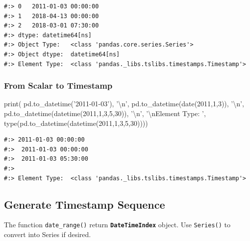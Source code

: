 \documentclass[
]{book}
\newenvironment{Shaded}{\begin{snugshade}}{\end{snugshade}}
\newcommand{\BuiltInTok}[1]{#1}
\newcommand{\CharTok}[1]{\textcolor[rgb]{0.5,0.5,0.5}{#1}}
\newcommand{\DecValTok}[1]{\textcolor[rgb]{0.06,0.06,0.06}{#1}}
\newcommand{\NormalTok}[1]{#1}
\newcommand{\StringTok}[1]{\textcolor[rgb]{0.5,0.5,0.5}{#1}}
\begin{document}
\begin{verbatim}
#:> 0   2011-01-03 00:00:00
#:> 1   2018-04-13 00:00:00
#:> 2   2018-03-01 07:30:00
#:> dtype: datetime64[ns] 
#:> Object Type:   <class 'pandas.core.series.Series'> 
#:> Object dtype:  datetime64[ns] 
#:> Element Type:  <class 'pandas._libs.tslibs.timestamps.Timestamp'>
\end{verbatim}

\hypertarget{from-scalar-to-timestamp}{%
\subsubsection{From Scalar to Timestamp}\label{from-scalar-to-timestamp}}

\begin{Shaded}
\begin{Highlighting}[]
\BuiltInTok{print}\NormalTok{( pd.to_datetime(}\StringTok{'2011-01-03'}\NormalTok{), }\StringTok{'}\CharTok{\textbackslash{}n}\StringTok{'}\NormalTok{,}
\NormalTok{       pd.to_datetime(date(}\DecValTok{2011}\NormalTok{,}\DecValTok{1}\NormalTok{,}\DecValTok{3}\NormalTok{)), }\StringTok{'}\CharTok{\textbackslash{}n}\StringTok{'}\NormalTok{,}
\NormalTok{       pd.to_datetime(datetime(}\DecValTok{2011}\NormalTok{,}\DecValTok{1}\NormalTok{,}\DecValTok{3}\NormalTok{,}\DecValTok{5}\NormalTok{,}\DecValTok{30}\NormalTok{)), }\StringTok{'}\CharTok{\textbackslash{}n}\StringTok{'}\NormalTok{,}
       \StringTok{'}\CharTok{\textbackslash{}n}\StringTok{Element Type: '}\NormalTok{, }\BuiltInTok{type}\NormalTok{(pd.to_datetime(datetime(}\DecValTok{2011}\NormalTok{,}\DecValTok{1}\NormalTok{,}\DecValTok{3}\NormalTok{,}\DecValTok{5}\NormalTok{,}\DecValTok{30}\NormalTok{))))}
\end{Highlighting}
\end{Shaded}

\begin{verbatim}
#:> 2011-01-03 00:00:00 
#:>  2011-01-03 00:00:00 
#:>  2011-01-03 05:30:00 
#:>  
#:> Element Type:  <class 'pandas._libs.tslibs.timestamps.Timestamp'>
\end{verbatim}

\hypertarget{generate-timestamp-sequence}{%
\subsection{Generate Timestamp Sequence}\label{generate-timestamp-sequence}}

The function \texttt{date\_range()} return \textbf{\texttt{DateTimeIndex}} object. Use \texttt{Series()} to convert into Series if desired.
\end{document}

